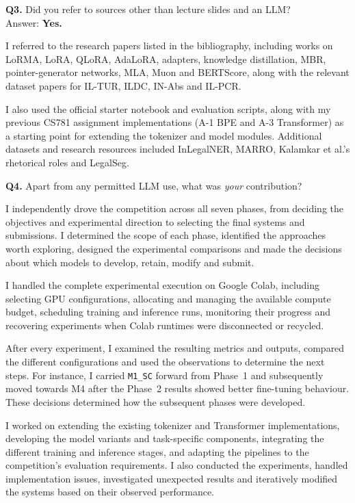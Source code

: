 \documentclass[11pt, oneside]{article}
\begin{document}
\medskip
\noindent
\textbf{Q3.} Did you refer to sources other than lecture slides and an LLM? \\[0.4em]
Answer: \textbf{Yes.}

\noindent
I referred to the research papers listed in the bibliography, including works on LoRMA, LoRA, QLoRA,
AdaLoRA, adapters, knowledge distillation, MBR, pointer-generator networks, MLA, Muon and BERTScore, along
with the relevant dataset papers for IL-TUR, ILDC, IN-Abs and IL-PCR.

\noindent
I also used the official starter notebook and evaluation scripts, along with my previous CS781 assignment
implementations (A-1 BPE and A-3 Transformer) as a starting point for extending the tokenizer and model
modules. Additional datasets and research resources included InLegalNER, MARRO, Kalamkar et al.'s
rhetorical roles and LegalSeg.

\medskip
\noindent
\textbf{Q4.} Apart from any permitted LLM use, what was \emph{your} contribution?

\noindent
I independently drove the competition across all seven phases, from deciding the objectives and
experimental direction to selecting the final systems and submissions. I determined the scope of each
phase, identified the approaches worth exploring, designed the experimental comparisons and made the
decisions about which models to develop, retain, modify and submit.

\noindent
I handled the complete experimental execution on Google Colab, including selecting GPU configurations,
allocating and managing the available compute budget, scheduling training and inference runs, monitoring
their progress and recovering experiments when Colab runtimes were disconnected or recycled.

\noindent
After every experiment, I examined the resulting metrics and outputs, compared the different
configurations and used the observations to determine the next steps. For instance, I carried
\texttt{M1\_SC} forward from Phase~1 and subsequently moved towards M4 after the Phase~2 results showed
better fine-tuning behaviour. These decisions determined how the subsequent phases were developed.

\noindent
I worked on extending the existing tokenizer and Transformer implementations, developing the model
variants and task-specific components, integrating the different training and inference stages, and
adapting the pipelines to the competition's evaluation requirements. I also conducted the experiments,
handled implementation issues, investigated unexpected results and iteratively modified the systems based
on their observed performance.
\end{document}
